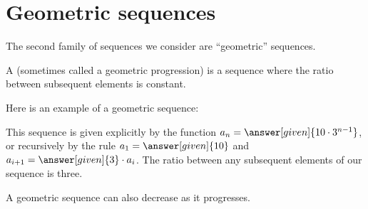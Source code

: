 \documentclass{ximera}
\begin{document}


\section{Geometric sequences}


The second family of sequences we consider are ``geometric''
sequences.

\begin{definition}
  A  (sometimes called a geometric
  progression) is a sequence where the
  ratio between subsequent elements is constant.
\end{definition}

\begin{example}
  Here is an example of a geometric sequence:
  \begin{image}
  \end{image}
  This sequence is given explicitly by the function $a_n=\answer[given]{10\cdot
    3^{n-1}}$, or recursively by the rule $a_1 = \answer[given]{10}$ and
  $a_{i+1} = \answer[given]{3}\cdot a_i$. The ratio between any subsequent elements of our sequence is three.
\end{example}

A geometric sequence can also decrease as it progresses.
\end{document}
